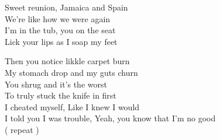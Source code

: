\begin{paracol}{3}
    \switchcolumn


    Sweet reunion, Jamaica and Spain \\
    We're like how we were again \\
    I'm in the tub, you on the seat \\
    Lick your lips as I soap my feet \\



    Then you notice likkle carpet burn \\
    My stomach drop and my guts churn \\
    You shrug and it's the worst \\
    To truly stuck the knife in first \\


    I cheated myself, Like I knew I would \\
    I told you I was trouble, Yeah, you know that I'm no good \\
    ( repeat )




\end{paracol}
